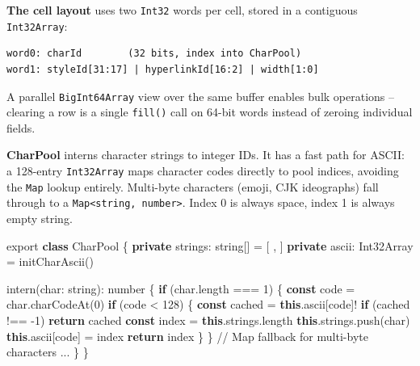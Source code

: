 \documentclass[
  english,
  11pt,
  letterpaper,
]{book}
\newenvironment{Shaded}{\begin{snugshade}}{\end{snugshade}}
\newcommand{\AttributeTok}[1]{\textcolor[rgb]{0.40,0.45,0.13}{#1}}
\newcommand{\BuiltInTok}[1]{\textcolor[rgb]{0.00,0.23,0.31}{#1}}
\newcommand{\CommentTok}[1]{\textcolor[rgb]{0.37,0.37,0.37}{#1}}
\newcommand{\ControlFlowTok}[1]{\textcolor[rgb]{0.00,0.23,0.31}{\textbf{#1}}}
\newcommand{\DataTypeTok}[1]{\textcolor[rgb]{0.68,0.00,0.00}{#1}}
\newcommand{\DecValTok}[1]{\textcolor[rgb]{0.68,0.00,0.00}{#1}}
\newcommand{\FunctionTok}[1]{\textcolor[rgb]{0.28,0.35,0.67}{#1}}
\newcommand{\ImportTok}[1]{\textcolor[rgb]{0.00,0.46,0.62}{#1}}
\newcommand{\KeywordTok}[1]{\textcolor[rgb]{0.00,0.23,0.31}{\textbf{#1}}}
\newcommand{\NormalTok}[1]{\textcolor[rgb]{0.00,0.23,0.31}{#1}}
\newcommand{\OperatorTok}[1]{\textcolor[rgb]{0.37,0.37,0.37}{#1}}
\newcommand{\StringTok}[1]{\textcolor[rgb]{0.13,0.47,0.30}{#1}}
\begin{document}
\textbf{The cell layout} uses two \texttt{Int32} words per cell, stored
in a contiguous \texttt{Int32Array}:

\begin{verbatim}
word0: charId        (32 bits, index into CharPool)
word1: styleId[31:17] | hyperlinkId[16:2] | width[1:0]
\end{verbatim}

A parallel \texttt{BigInt64Array} view over the same buffer enables bulk
operations -- clearing a row is a single \texttt{fill()} call on 64-bit
words instead of zeroing individual fields.

\textbf{CharPool} interns character strings to integer IDs. It has a
fast path for ASCII: a 128-entry \texttt{Int32Array} maps character
codes directly to pool indices, avoiding the \texttt{Map} lookup
entirely. Multi-byte characters (emoji, CJK ideographs) fall through to
a \texttt{Map\textless{}string,\ number\textgreater{}}. Index 0 is
always space, index 1 is always empty string.

\begin{Shaded}
\begin{Highlighting}[]
\ImportTok{export} \KeywordTok{class}\NormalTok{ CharPool \{}
  \KeywordTok{private}\NormalTok{ strings}\OperatorTok{:} \DataTypeTok{string}\NormalTok{[] }\OperatorTok{=}\NormalTok{ [}\StringTok{\textquotesingle{} \textquotesingle{}}\OperatorTok{,} \StringTok{\textquotesingle{}\textquotesingle{}}\NormalTok{]}
  \KeywordTok{private}\NormalTok{ ascii}\OperatorTok{:} \BuiltInTok{Int32Array} \OperatorTok{=} \FunctionTok{initCharAscii}\NormalTok{()}

  \FunctionTok{intern}\NormalTok{(char}\OperatorTok{:} \DataTypeTok{string}\NormalTok{)}\OperatorTok{:} \DataTypeTok{number}\NormalTok{ \{}
    \ControlFlowTok{if}\NormalTok{ (char}\OperatorTok{.}\AttributeTok{length} \OperatorTok{===} \DecValTok{1}\NormalTok{) \{}
      \KeywordTok{const}\NormalTok{ code }\OperatorTok{=}\NormalTok{ char}\OperatorTok{.}\FunctionTok{charCodeAt}\NormalTok{(}\DecValTok{0}\NormalTok{)}
      \ControlFlowTok{if}\NormalTok{ (code }\OperatorTok{\textless{}} \DecValTok{128}\NormalTok{) \{}
        \KeywordTok{const}\NormalTok{ cached }\OperatorTok{=} \KeywordTok{this}\OperatorTok{.}\AttributeTok{ascii}\NormalTok{[code]}\OperatorTok{!}
        \ControlFlowTok{if}\NormalTok{ (cached }\OperatorTok{!==} \OperatorTok{{-}}\DecValTok{1}\NormalTok{) }\ControlFlowTok{return}\NormalTok{ cached}
        \KeywordTok{const}\NormalTok{ index }\OperatorTok{=} \KeywordTok{this}\OperatorTok{.}\AttributeTok{strings}\OperatorTok{.}\AttributeTok{length}
        \KeywordTok{this}\OperatorTok{.}\AttributeTok{strings}\OperatorTok{.}\FunctionTok{push}\NormalTok{(char)}
        \KeywordTok{this}\OperatorTok{.}\AttributeTok{ascii}\NormalTok{[code] }\OperatorTok{=}\NormalTok{ index}
        \ControlFlowTok{return}\NormalTok{ index}
\NormalTok{      \}}
\NormalTok{    \}}
    \CommentTok{// Map fallback for multi{-}byte characters}
    \OperatorTok{...}
\NormalTok{  \}}
\NormalTok{\}}
\end{Highlighting}
\end{Shaded}
\end{document}
